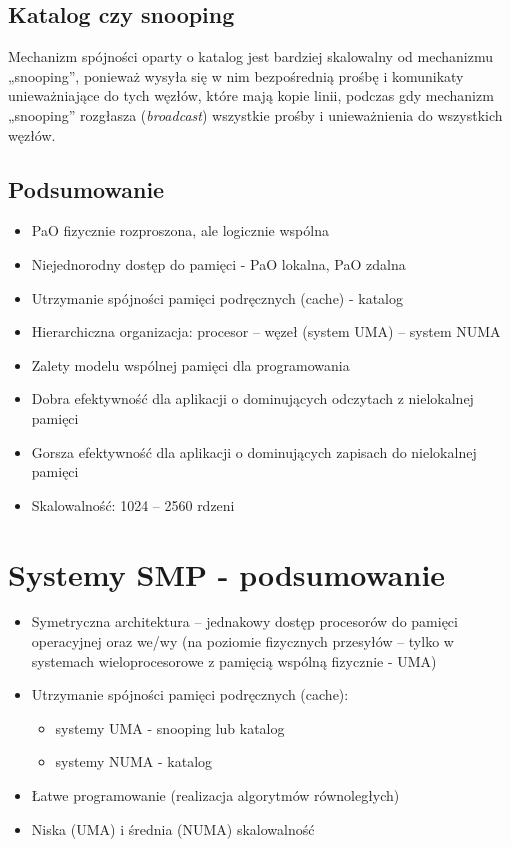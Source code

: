 	\subsection{Katalog czy snooping}
		Mechanizm spójności oparty o katalog jest bardziej skalowalny od mechanizmu „snooping”, ponieważ wysyła się w nim bezpośrednią prośbę i komunikaty unieważniające do tych węzłów, które mają kopie linii, podczas gdy mechanizm „snooping” rozgłasza (\emph{broadcast}) wszystkie prośby i unieważnienia do wszystkich węzłów.
			
	\subsection{Podsumowanie}
		\begin{itemize}
			\item PaO fizycznie rozproszona, ale logicznie wspólna
			\item Niejednorodny dostęp do pamięci - PaO lokalna, PaO zdalna
			\item Utrzymanie spójności pamięci podręcznych (cache) - katalog
			\item Hierarchiczna organizacja: procesor – węzeł (system UMA) – system NUMA
			\item Zalety modelu wspólnej pamięci dla programowania
			\item Dobra efektywność dla aplikacji o dominujących odczytach z nielokalnej pamięci
			\item Gorsza efektywność dla aplikacji o dominujących zapisach do nielokalnej pamięci
			\item Skalowalność: 1024 – 2560 rdzeni
		\end{itemize}
		
\section{Systemy SMP - podsumowanie}
	\begin{itemize}
		\item Symetryczna architektura – jednakowy dostęp procesorów do pamięci operacyjnej oraz we/wy (na poziomie fizycznych przesyłów –
		tylko w systemach wieloprocesorowe z pamięcią wspólną fizycznie - UMA)
		\item Utrzymanie spójności pamięci podręcznych (cache):
		\begin{itemize}
			\item systemy UMA - snooping lub katalog
			\item systemy NUMA - katalog
		\end{itemize}
		\item Łatwe programowanie (realizacja algorytmów równoległych)
		\item Niska (UMA) i średnia (NUMA) skalowalność
	\end{itemize}

